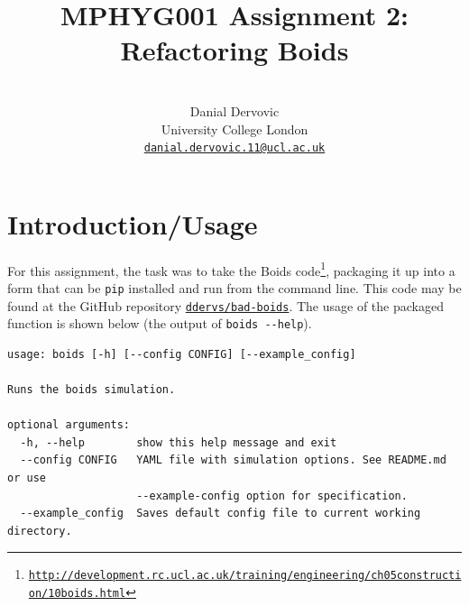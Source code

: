 \documentclass{article}
\title{MPHYG001 Assignment 2: Refactoring Boids}
\author{\\
Danial Dervovic\\
\normalsize University College London\\
\normalsize \href{mailto:danial.dervovic.11@ucl.ac.uk}{\texttt{danial.dervovic.11@ucl.ac.uk}}
}
\begin{document}
\maketitle
\section*{Introduction/Usage}
For this assignment, the task was to take the Boids code\footnote{\href{http://development.rc.ucl.ac.uk/training/engineering/ch05construction/10boids.html}{\texttt{http://development.rc.ucl.ac.uk/training/engineering/ch05construction/10boids.html}}}, packaging it up into a form that can be \texttt{pip} installed and run from the command line. This code may be found at the GitHub repository \href{https://github.com/ddervs/bad-boids}{\texttt{ddervs/bad-boids}}. The usage of the packaged function is shown below (the output of \texttt{boids -{}-help}).
\begin{lstlisting}
usage: boids [-h] [--config CONFIG] [--example_config]

Runs the boids simulation.

optional arguments:
  -h, --help        show this help message and exit
  --config CONFIG   YAML file with simulation options. See README.md or use
                    --example-config option for specification.
  --example_config  Saves default config file to current working directory.
\end{lstlisting}
\end{document}
